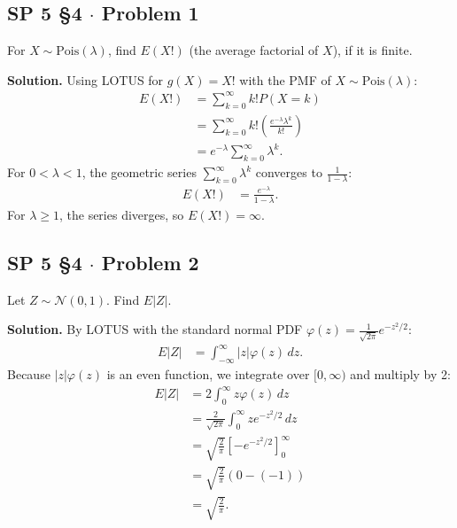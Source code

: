\documentclass[11pt,a4paper]{article}
\begin{document}
\vspace{10pt}
\subsection{SP 5 \S4 $\cdot$ Problem 1}
\begin{tcolorbox}[title={SP 5 \S4 $\cdot$ Problem 1}]
For $X \sim \text{Pois}(\lambda)$, find $E(X!)$ (the average factorial of $X$), if it is finite.
\end{tcolorbox}

\noindent \textbf{Solution.} Using LOTUS for $g(X) = X!$ with the PMF of $X \sim \text{Pois}(\lambda)$:
\begin{align*}
E(X!) &= \sum_{k=0}^{\infty} k! P(X = k) \\
&= \sum_{k=0}^{\infty} k! \left( \frac{e^{-\lambda} \lambda^k}{k!} \right) \\
&= e^{-\lambda} \sum_{k=0}^{\infty} \lambda^k.
\end{align*}
For $0 < \lambda < 1$, the geometric series $\sum_{k=0}^{\infty} \lambda^k$ converges to $\frac{1}{1 - \lambda}$:
\begin{align*}
E(X!) &= \frac{e^{-\lambda}}{1 - \lambda}.
\end{align*}
For $\lambda \ge 1$, the series diverges, so $E(X!) = \infty$.

\vspace{10pt}
\subsection{SP 5 \S4 $\cdot$ Problem 2}
\begin{tcolorbox}[title={SP 5 \S4 $\cdot$ Problem 2}]
Let $Z \sim \mathcal{N}(0, 1)$. Find $E|Z|$.
\end{tcolorbox}

\noindent \textbf{Solution.} By LOTUS with the standard normal PDF $\varphi(z) = \frac{1}{\sqrt{2\pi}} e^{-z^2/2}$:
\begin{align*}
E|Z| &= \int_{-\infty}^{\infty} |z| \varphi(z) \, dz.
\end{align*}
Because $|z| \varphi(z)$ is an even function, we integrate over $[0, \infty)$ and multiply by 2:
\begin{align*}
E|Z| &= 2 \int_{0}^{\infty} z \varphi(z) \, dz \\
&= \frac{2}{\sqrt{2\pi}} \int_{0}^{\infty} z e^{-z^2/2} \, dz \\
&= \sqrt{\frac{2}{\pi}} \left[ -e^{-z^2/2} \right]_{0}^{\infty} \\
&= \sqrt{\frac{2}{\pi}} (0 - (-1)) \\
&= \sqrt{\frac{2}{\pi}}.
\end{align*}
\end{document}
